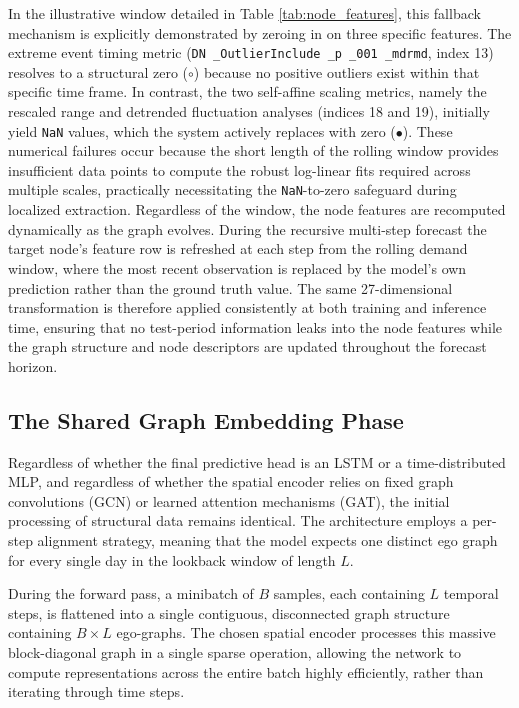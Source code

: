 In the illustrative window detailed in Table \ref{tab:node_features}, this fallback mechanism is explicitly demonstrated by zeroing in on three specific features. The extreme event timing metric (\texttt{DN \_OutlierInclude \_p \_001 \_mdrmd}, index 13) resolves to a structural zero (\(\circ\)) because no positive outliers exist within that specific time frame. In contrast, the two self-affine scaling metrics, namely the rescaled range and detrended fluctuation analyses (indices 18 and 19), initially yield \texttt{NaN} values, which the system actively replaces with zero (\(\bullet\)). These numerical failures occur because the short length of the rolling window provides insufficient data points to compute the robust log-linear fits required across multiple scales, practically necessitating the \texttt{NaN}-to-zero safeguard during localized extraction.
Regardless of the window, the node features are recomputed dynamically as the
graph evolves.  During the recursive multi-step forecast the target node's
feature row is refreshed at each step from the rolling demand window, where
the most recent observation is replaced by the model's own prediction rather
than the ground truth value.  The same 27-dimensional transformation is
therefore applied consistently at both training and inference time, ensuring
that no test-period information leaks into the node features while the graph
structure and node descriptors are updated throughout the forecast horizon.

\subsection{The Shared Graph Embedding Phase}

Regardless of whether the final predictive head is an LSTM or a time-distributed MLP, and regardless of whether the spatial encoder relies on fixed graph convolutions (GCN) or learned attention mechanisms (GAT), the initial processing of structural data remains identical. The architecture employs a per-step alignment strategy, meaning that the model expects one distinct ego graph for every single day in the lookback window of length $L$.

During the forward pass, a minibatch of $B$ samples, each containing $L$ temporal steps, is flattened into a single contiguous, disconnected graph structure containing $B \times L$ ego-graphs. The chosen spatial encoder processes this massive block-diagonal graph in a single sparse operation, allowing the network to compute representations across the entire batch highly efficiently, rather than iterating through time steps.

